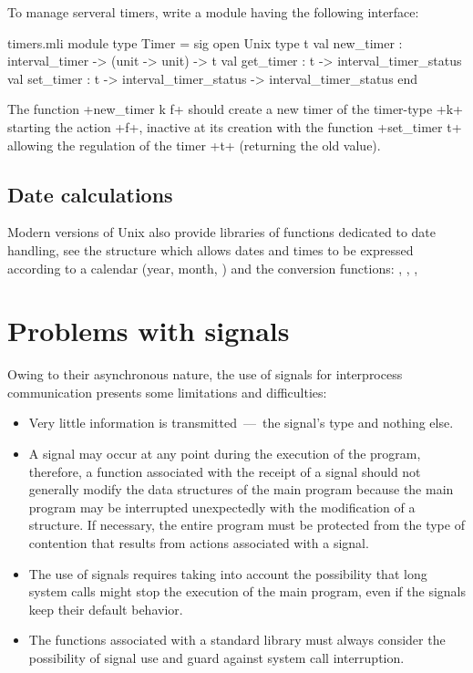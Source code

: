 \begin{exercise}[noanswer]

To manage serveral timers, write a module having the following interface:
%
\begin{listingcodefile}{timers.mli}
module type Timer = sig
  open Unix
  type t
  val new_timer : interval_timer -> (unit -> unit) -> t
  val get_timer : t -> interval_timer_status
  val set_timer : t -> interval_timer_status -> interval_timer_status
end
\end{listingcodefile}
%

The function \ml+new_timer k f+ should create a new timer of the 
timer-type \ml+k+ starting the action \ml+f+, inactive at its creation with 
the function \ml+set_timer t+ allowing the regulation of the timer \ml+t+ 
(returning the old value). 

\end{exercise}

\subsection* {Date calculations}

Modern versions of Unix also provide libraries of functions dedicated
to date handling, see the structure  which allows
dates and times to be expressed according to a calendar (year, month,
\etc) and the conversion functions: ,
, , \etc

\section{Problems with signals}

Owing to their asynchronous nature, the use of signals for interprocess communication 
presents some limitations and difficulties:
%
\begin{itemize}

\item Very little information is transmitted~---~the signal's
type and nothing else.

\item A signal may occur at any point during the execution 
of the program, therefore, a function associated with the receipt 
of a signal should not generally modify the data structures of 
the main program because the main program may be interrupted 
unexpectedly with the modification of a structure.  If necessary,
the entire program must be protected from the type of contention that
results from actions associated with a signal.

\item The use of signals requires taking into account the 
possibility that long system calls might stop the execution of the 
main program, even if the signals keep their default behavior.

\item The functions associated with a standard library must always 
consider the possibility of signal use and guard against system 
call interruption.

\end{itemize}
%


